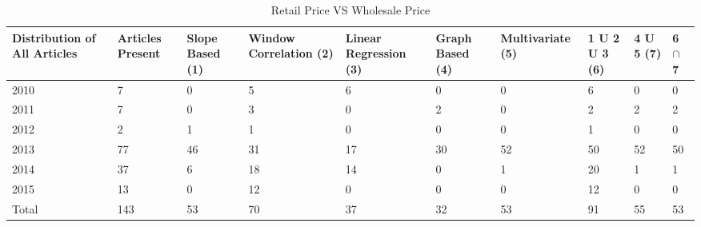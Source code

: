 \documentclass[a4paper,10pt]{report}
\begin{document}
	
	\begin{table}[]
	\centering
	\resizebox{\textwidth}{!}
	{\begin{tabular}{|l|l|l|l|l|l|l|l|l|l|}
	\hline
	Distribution of All Articles & Articles Present & Slope Based (1) & Window Correlation (2) & Linear Regression (3) & Graph Based (4) & Multivariate (5) & 1 U 2 U 3 (6) & 4 U 5 (7) & 6  $\cap$ 7 \\
	\hline
	2010                         & 7                & 0           & 5           & 6                 & 0           & 0             & 6         & 0     & 0                                     \\
	\hline
	2011                         & 7                & 0           & 3           & 0                 & 2           & 0             & 2         & 2     & 2                                     \\
	\hline
	2012                         & 2                & 1           & 1           & 0                 & 0           & 0             & 1         & 0     & 0                                     \\
	\hline
	2013                         & 77               & 46          & 31          & 17                & 30          & 52            & 50        & 52    & 50                                    \\
	\hline
	2014                         & 37               & 6           & 18          & 14                & 0           & 1             & 20        & 1     & 1                                     \\
	\hline
	2015                         & 13               & 0           & 12          & 0                 & 0           & 0             & 12        & 0     & 0                                     \\
	\hline
	Total                        & 143              & 53          & 70          & 37                & 32          & 53            & 91        & 55    & 53                                   \\
	\hline
	\end{tabular}}	
	\caption{Retail Price VS Wholesale Price}
	\label{RetailVsWholesale}
	\end{table}

	
	
\end{document}
